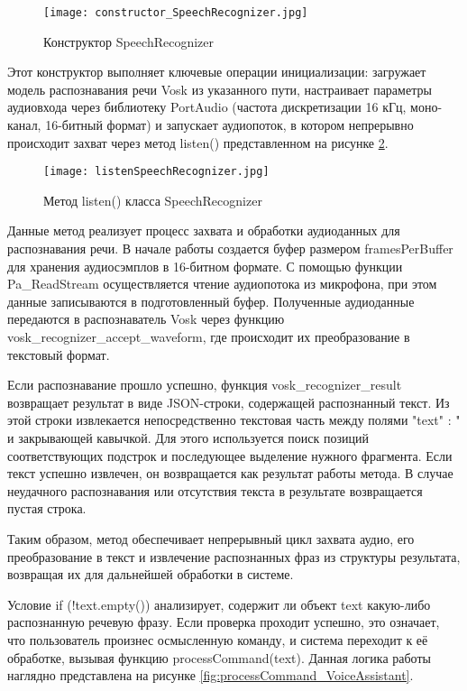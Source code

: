 \begin{figure}[H]
	\centering
	\texttt{[image: constructor\_SpeechRecognizer.jpg]}
	\caption{Конструктор SpeechRecognizer}
		\label{fig:constructor_SpeechRecognizer}
\end{figure}
Этот конструктор выполняет ключевые операции инициализации: загружает модель распознавания речи Vosk из указанного пути, настраивает параметры аудиовхода через библиотеку PortAudio (частота дискретизации 16 кГц, моно-канал, 16-битный формат) и запускает аудиопоток, в котором непрерывно происходит захват  через метод listen() представленном на рисунке \ref{fig:listenSpeechRecognizer}.

\begin{figure}[H]
	\centering
	\texttt{[image: listenSpeechRecognizer.jpg]}
	\caption{Метод listen() класса SpeechRecognizer}
	\label{fig:listenSpeechRecognizer}
\end{figure}

Данные метод реализует процесс захвата и обработки аудиоданных для распознавания речи. В начале работы создается буфер размером framesPerBuffer для хранения аудиосэмплов в 16-битном формате. С помощью функции Pa\_ReadStream осуществляется чтение аудиопотока из микрофона, при этом данные записываются в подготовленный буфер. Полученные аудиоданные передаются в распознаватель Vosk через функцию vosk\_recognizer\_accept\_waveform, где происходит их преобразование в текстовый формат.

Если распознавание прошло успешно, функция vosk\_recognizer\_result возвращает результат в виде JSON-строки, содержащей распознанный текст. Из этой строки извлекается непосредственно текстовая часть между полями \string"text\string" : \string" и закрывающей кавычкой. Для этого используется поиск позиций соответствующих подстрок и последующее выделение нужного фрагмента. Если текст успешно извлечен, он возвращается как результат работы метода. В случае неудачного распознавания или отсутствия текста в результате возвращается пустая строка.

Таким образом, метод обеспечивает непрерывный цикл захвата аудио, его преобразование в текст и извлечение распознанных фраз из структуры результата, возвращая их для дальнейшей обработки в системе.

Условие if (!text.empty()) анализирует, содержит ли объект text какую-либо распознанную речевую фразу. Если проверка проходит успешно, это означает, что пользователь произнес осмысленную команду, и система переходит к её обработке, вызывая функцию processCommand(text). Данная логика работы наглядно представлена на рисунке \ref{fig:processCommand_VoiceAssistant}.

